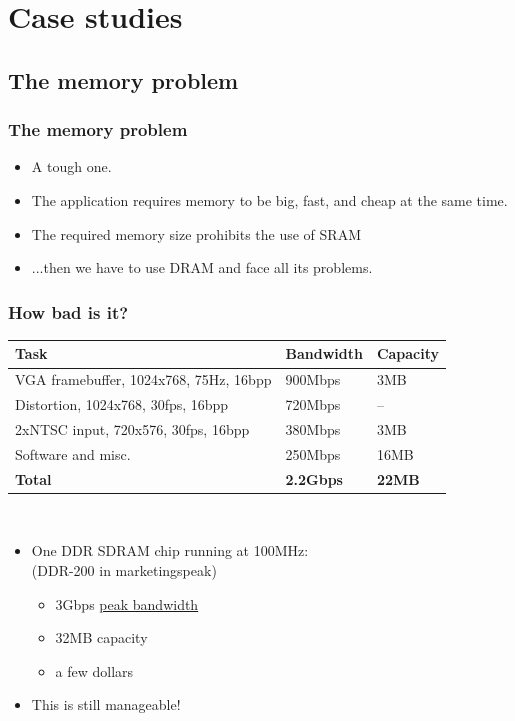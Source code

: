 \documentclass{beamer}
\begin{document}
\section{Case studies}

\subsection{The memory problem}
\frame
{
  \begin{center}
  \end{center}
}

\frame
{
  \frametitle{The memory problem}
  
  \begin{itemize}
  \item A tough one.
  \item The application requires memory to be big, fast, and cheap at the same time.
  \item The required memory size prohibits the use of SRAM
  \item ...then we have to use DRAM and face all its problems.
  \end{itemize}
}

\frame
{
  \frametitle{How bad is it?}
  
  \begin{tabular}{|l|l|l|}
  \hline
  \textbf{Task} & \textbf{Bandwidth} & \textbf{Capacity} \\
  \hline
  VGA framebuffer, 1024x768, 75Hz, 16bpp & 900Mbps & 3MB \\
  \hline
  Distortion, 1024x768, 30fps, 16bpp & 720Mbps & -- \\
  \hline
  2xNTSC input, 720x576, 30fps, 16bpp & 380Mbps & 3MB \\
  \hline
  Software and misc. & 250Mbps & 16MB \\
  \hline
  \textbf{Total} & \textbf{2.2Gbps} & \textbf{22MB} \\
  \hline
  \end{tabular}\\
  
  \begin{itemize}
  \item One DDR SDRAM chip running at 100MHz:\\(DDR-200 in marketingspeak)
  \begin{itemize}
  \item 3Gbps \underline{peak bandwidth}
  \item 32MB capacity
  \item a few dollars
  \end{itemize}
  \item This is still manageable!
  \end{itemize}
}
\end{document}
